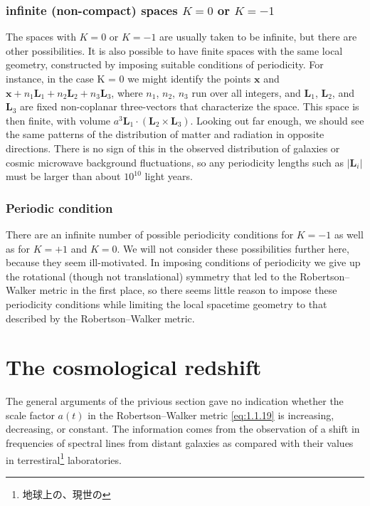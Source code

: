 \documentclass[11pt]{ltjsarticle}
\theoremstyle{plain}
\theoremstyle{break}
\newcommand{\mbfx}{\mathbf{x}}
\newcommand{\mbfL}{\mathbf{L}}
\begin{document}
\subsubsection{infinite (non-compact) spaces $K=0$ or $K=-1$ }
The spaces with $K=0$ or $K=-1$ are usually taken to be infinite, but there are other possibilities.
It is also possible to have finite spaces with the same local geometry, constructed by imposing suitable conditions of periodicity.
For instance, in the case K = 0 we might identify the points $\mbfx$ and $\mbfx + n_1 \mbfL_1 + n_2 \mbfL_2 + n_3 \mbfL_3$, where $n_1$, $n_2$, $n_3$ run over all integers, and $\mbfL_1$, $\mbfL_2$, and $\mbfL_3$ are fixed non-coplanar three-vectors that characterize the space.
This space is then finite, with volume $a^3 \mbfL_1 \cdot (\mbfL_2 \times \mbfL_3)$.
 Looking out far enough, we should see the same patterns of the distribution of matter and radiation in opposite directions. There is no sign of this in the observed distribution of galaxies or cosmic microwave background fluctuations,
so any periodicity lengths such as $|\mbfL_i |$ must be larger than about $10^{10}$ light years.

\subsubsection{Periodic condition}
There are an infinite number of possible periodicity conditions for $K = -1$ as well as for $K = +1$ and $K = 0$.
We will not consider these possibilities further here, because they seem ill-motivated. In imposing conditions of periodicity we give up the rotational (though not translational) symmetry that led to the Robertson–Walker metric in the first place,
so there seems little reason to impose these periodicity conditions while limiting the local spacetime geometry to that described by the Robertson–Walker metric.

\section{The cosmological redshift}\label{sec:1.2.The-cosmological-redshift}
The general arguments of the privious section gave no indication whether the scale factor $a(t)$ in the Robertson–Walker metric \eqref{eq:1.1.19} is increasing, decreasing, or constant.
The information comes from the observation of a shift in frequencies of spectral lines from distant galaxies as compared with their values in terrestiral\footnote{地球上の、現世の} laboratories.
\end{document}
